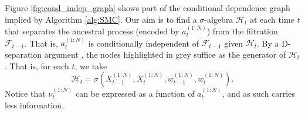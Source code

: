 Figure \ref{fig:cond_indep_graph} shows part of the conditional dependence graph implied by Algorithm \ref{alg:SMC}. Our aim is to find a $\sigma$-algebra $\mathcal{H}_t$ at each time $t$ that separates the ancestral process (encoded by $a_t^{(1:N)}$) from the filtration $\mathcal{F}_{t-1}$. That is, $a_t^{(1:N)}$ is conditionally independent of $\mathcal{F}_{t-1}$ given $\mathcal{H}_t$.
By a D-separation argument \parencite[see][]{verma1988}, the nodes highlighted in grey suffice as the generator of $\mathcal{H}_t$. That is, for each $t$, we take
\begin{equation*}
\mathcal{H}_t = \sigma(X_{t-1}^{(1:N)}, X_t^{(1:N)}, w_{t-1}^{(1:N)}, w_t^{(1:N)} ).
\end{equation*}
Notice that $\nu_t^{(1:N)}$ can be expressed as a function of $a_t^{(1:N)}$, and as such carries less information.
